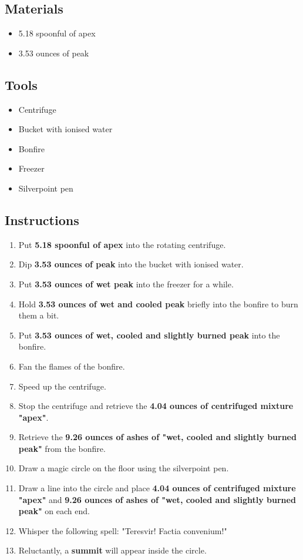 \documentclass{article}
\begin{document}
\subsection{Materials}\begin{itemize}
\item 
5.18 spoonful of apex
\item 
3.53 ounces of peak
\end{itemize}
\subsection{Tools}\begin{itemize}
\item 
Centrifuge
\item 
Bucket with ionised water
\item 
Bonfire
\item 
Freezer
\item 
Silverpoint pen
\end{itemize}
\subsection{Instructions}\begin{enumerate}
\item 
Put \textbf{5.18 spoonful of apex} into the rotating centrifuge.
\item 
Dip \textbf{3.53 ounces of peak} into the bucket with ionised water.
\item 
Put \textbf{3.53 ounces of wet peak} into the freezer for a while.
\item 
Hold \textbf{3.53 ounces of wet and cooled peak} briefly into the bonfire to burn them a bit.
\item 
Put \textbf{3.53 ounces of wet, cooled and slightly burned peak} into the bonfire.
\item 
Fan the flames of the bonfire.
\item 
Speed up the centrifuge.
\item 
Stop the centrifuge and retrieve the \textbf{4.04 ounces of centrifuged mixture "apex"}.
\item 
Retrieve the \textbf{9.26 ounces of ashes of "wet, cooled and slightly burned peak"} from the bonfire.
\item 
Draw a magic circle on the floor using the silverpoint pen.
\item 
Draw a line into the circle and place \textbf{4.04 ounces of centrifuged mixture "apex"} and \textbf{9.26 ounces of ashes of "wet, cooled and slightly burned peak"} on each end.
\item 
Whisper the following spell: "Teresvir! Factia convenium!"
\item 
Reluctantly, a \textbf{summit} will appear inside the circle.
\end{enumerate}
\newpage
\end{document}
